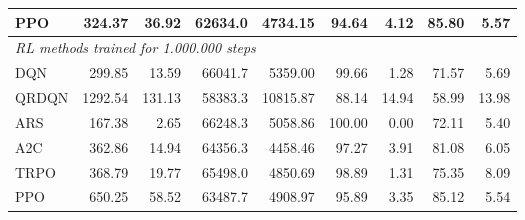 \begin{samepage}
\begin{center}
\begin{tabular}{l|rr|rr|rr|rr}
    PPO          &   324.37 &    36.92 &    62634.0 &    4734.15 &   94.64 &    4.12 &   85.80 &    5.57 \\
    \midrule
    \multicolumn{9}{l}{\textit{RL methods trained for 1.000.000 steps}} \\
    \midrule
    DQN          &   299.85 &    13.59 &    66041.7 &    5359.00 &   99.66 &    1.28 &   71.57 &    5.69 \\
    QRDQN        &  1292.54 &   131.13 &    58383.3 &   10815.87 &   88.14 &   14.94 &   58.99 &   13.98 \\
    ARS          &   167.38 &     2.65 &    66248.3 &    5058.86 &  100.00 &    0.00 &   72.11 &    5.40 \\
    A2C          &   362.86 &    14.94 &    64356.3 &    4458.46 &   97.27 &    3.91 &   81.08 &    6.05 \\
    TRPO         &   368.79 &    19.77 &    65498.0 &    4850.69 &   98.89 &    1.31 &   75.35 &    8.09 \\
    PPO          &   650.25 &    58.52 &    63487.7 &    4908.97 &   95.89 &    3.35 &   85.12 &    5.54 \\
    \bottomrule
  \end{tabular}
\end{center}
\end{samepage}

